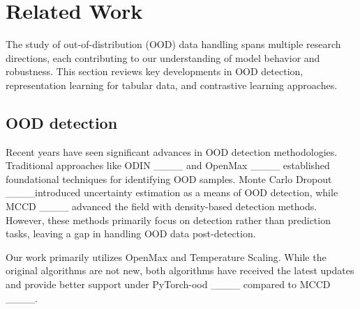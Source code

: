 \section{Related Work}
The study of out-of-distribution (OOD) data handling spans multiple research directions, each contributing to our understanding of model behavior and robustness. This section reviews key developments in OOD detection, representation learning for tabular data, and contrastive learning approaches.
\subsection{OOD detection}


Recent years have seen significant advances in OOD detection methodologies. Traditional approaches like ODIN ____ and OpenMax ____ established foundational techniques for identifying OOD samples. Monte Carlo Dropout ____introduced uncertainty estimation as a means of OOD detection, while MCCD ____ advanced the field with density-based detection methods. However, these methods primarily focus on detection rather than prediction tasks, leaving a gap in handling OOD data post-detection.

Our work primarily utilizes OpenMax and Temperature Scaling. While the original algorithms are not new, both algorithms have received the latest updates and provide better support under PyTorch-ood ____ compared to MCCD ____.

